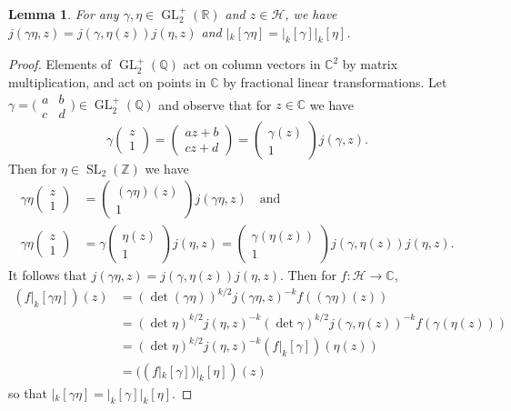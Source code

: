 \documentclass[10pt,leqno,twoside,b5paper]{article}
\theoremstyle{plain}
\newtheorem{lemma}[lem]{Lemma}
\theoremstyle{definition}
\numberwithin{equation}{section}
\numberwithin{lem}{section}
\DeclareMathOperator{\GL}{GL}
\DeclareMathOperator{\SL}{SL}
\newcommand{\smallabcd}{\big(\!\begin{smallmatrix}
    a & b \\ c & d
\end{smallmatrix}\!\big)}
\newcommand{\slz}{\SL_2(\mathbb{Z})}
\newcommand{\glrp}{\GL_2^+(\mathbb{R})}
\newcommand{\glqp}{\GL_2^+(\mathbb{Q})}
\begin{document}
\begin{lemma}\label{lem: props of automorphy}
    For any $\gamma,\eta\in \glrp$ and $z\in \mathcal H$, we have $j(\gamma\eta,z) = j(\gamma,\eta(z))j(\eta,z)$ and $|_k[\gamma\eta] = |_k[\gamma]|_k[\eta]$.
\end{lemma}
\begin{proof}
    Elements of $\glqp$ act on column vectors in $\mathbb C^2$ by matrix multiplication, and act on points in $\mathbb C$ by fractional linear transformations. Let $\gamma = \smallabcd\in \glqp$ and observe that for $z\in\mathbb C$ we have \[\gamma\begin{pmatrix}
        z \\ 1
    \end{pmatrix} = \begin{pmatrix}
        az+b \\ cz+d
    \end{pmatrix} = \begin{pmatrix}
        \gamma(z) \\ 1
    \end{pmatrix}j(\gamma,z).\]
    Then for $\eta\in\slz$ we have
    \begin{align*}
        \gamma\eta\begin{pmatrix}
            z \\ 1
        \end{pmatrix} &= \begin{pmatrix}
            (\gamma\eta)(z) \\ 1
        \end{pmatrix}j(\gamma\eta,z)\quad\text{and}\\
        \gamma\eta\begin{pmatrix}
            z \\ 1
        \end{pmatrix} &= \gamma\begin{pmatrix}
            \eta(z) \\ 1
        \end{pmatrix}j(\eta,z) = \begin{pmatrix}
            \gamma(\eta(z)) \\ 1
        \end{pmatrix}j(\gamma,\eta(z))j(\eta,z).
    \end{align*} 
    It follows that $j(\gamma\eta,z) = j(\gamma,\eta(z))j(\eta,z)$.
    Then for $f\colon \mathcal H\to \mathbb C$,
    \begin{align*}
        (f|_k[\gamma\eta])(z) &= (\det(\gamma\eta))^{k/2}j(\gamma\eta,z)^{-k}f((\gamma\eta)(z))\\
        &= (\det \eta)^{k/2}j(\eta,z)^{-k}(\det \gamma)^{k/2}j(\gamma,\eta(z))^{-k}f(\gamma(\eta(z)))\\
        &= (\det \eta)^{k/2}j(\eta,z)^{-k}(f|_k[\gamma])(\eta(z))\\
        &= ((f|_k[\gamma])|_k[\eta])(z)
    \end{align*} so that $|_k[\gamma\eta] = |_k[\gamma]|_k[\eta]$.
\end{proof}
\end{document}
